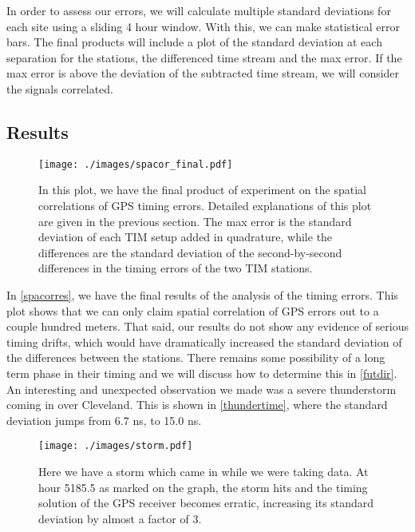 In order to assess our errors, we will calculate multiple standard deviations for each site using a sliding 4 hour window. With this, we can make statistical error bars. The final products will include a plot of the standard deviation at each separation for the stations, the differenced time stream and the max error. If the max error is above the deviation of the subtracted time stream, we will consider the signals correlated. %
\subsection{Results}
\begin{figure}[h!]
\centering
\texttt{[image: ./images/spacor\_final.pdf]}
\caption[Spatial Correlation Results]{In this plot, we have the final product of experiment on the spatial correlations of GPS timing errors. Detailed explanations of this plot are given in the previous section. The max error is the standard deviation of each TIM setup added in quadrature, while the differences are the standard deviation of the second-by-second differences in the timing errors of the two TIM stations.}
\label{spacorres}
\end{figure}
In \autoref{spacorres}, we have the final results of the analysis of the timing errors. This plot shows that we can only claim spatial correlation of GPS errors out to a couple hundred meters. That said, our results do not show any evidence of serious timing drifts, which would have dramatically increased the standard deviation of the differences between the stations. There remains some possibility of a long term phase in their timing and we will discuss how to determine this in \autoref{futdir}. An interesting and unexpected observation we made was a severe thunderstorm coming in over Cleveland. This is shown in \autoref{thundertime}, where the standard deviation jumps from 6.7 ns, to 15.0 ns.
\begin{figure}[H]
\centering
\texttt{[image: ./images/storm.pdf]}
\caption[Effects of a Thunderstorm on GPS Timing]{Here we have a storm which came in while we were taking data. At hour 5185.5 as marked on the graph, the storm hits and the timing solution of the GPS receiver becomes erratic, increasing its standard deviation by almost a factor of 3.}
\label{thundertime}
\end{figure}
